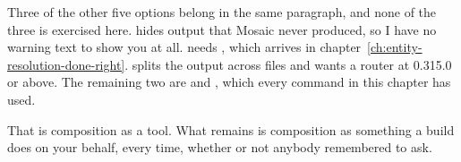 \medskip
Three of the other five options belong in the same paragraph, and none of the
three is exercised here.  hides output that Mosaic
never produced, so I have no warning text to show you at all.
 needs , which arrives in
chapter~\ref{ch:entity-resolution-done-right}. 
splits the output across files and wants a router at 0.315.0 or above. The
remaining two are  and , which every command in this chapter
has used.

That is composition as a tool. What remains is composition as something a build
does on your behalf, every time, whether or not anybody remembered to ask.

%
